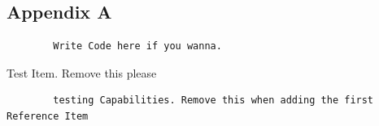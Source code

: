 \documentclass[a4paper, 11pt]{article}
\begin{document}
\begin{enumerate}
\newpage

\section{Appendix A}
	
	\begin{verbatim}
	    Write Code here if you wanna.
	\end{verbatim}

\newpage

\begin{thebibliography}{9}
	 Test Item. Remove this please 
	\begin{verbatim}
	    testing Capabilities. Remove this when adding the first Reference Item
	\end{verbatim}

\end{thebibliography}


\end{enumerate}
\end{document}
